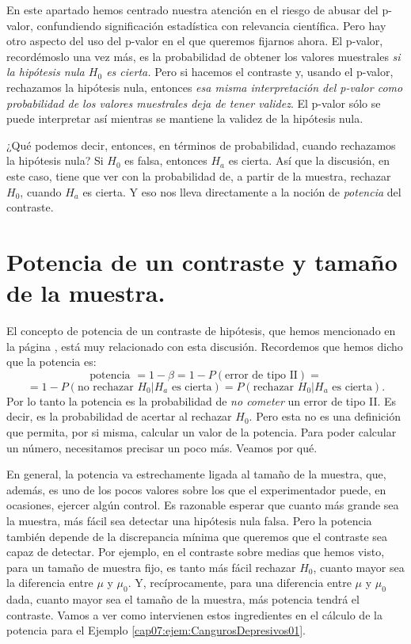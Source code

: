 En este apartado hemos centrado nuestra atención en el riesgo de abusar del p-valor, confundiendo significación estadística con relevancia científica. Pero hay otro aspecto del uso del p-valor en el que queremos fijarnos ahora. El p-valor, recordémoslo una vez más, es la probabilidad de obtener los valores muestrales {\em si la hipótesis nula $H_0$ es cierta.} Pero si hacemos el contraste y, usando el p-valor, rechazamos la hipótesis nula, entonces {\em esa misma interpretación del p-valor como probabilidad de los valores muestrales deja de tener validez}. El p-valor sólo se puede interpretar así mientras se mantiene la validez de la hipótesis nula.

¿Qué podemos decir, entonces, en términos de probabilidad, cuando rechazamos la hipótesis nula? Si $H_0$ es falsa, entonces $H_a$ es cierta. Así que la discusión, en este caso, tiene que ver con la probabilidad de, a partir de la muestra, rechazar $H_0$, cuando $H_a$ es cierta. Y eso nos lleva directamente a la noción de {\em potencia} del contraste.


\section{Potencia de un contraste y tamaño de la muestra.}
\label{cap07:sec:PotenciaContraste}


El concepto de {\sf potencia} de un contraste de hipótesis, que hemos mencionado en la página \pageref{cap07:ecu:BetaErrorTipoII}, está muy relacionado con esta discusión. Recordemos que hemos dicho que la potencia es:
\[\mbox{potencia } =  1-\beta=1-P(\mbox{error de tipo II})=\]
\[=1-P(\mbox{no rechazar }H_0 | H_a\mbox{ es cierta})=P(\mbox{rechazar }H_0 | H_a\mbox{ es cierta}).\]
Por lo tanto la potencia es la probabilidad de {\em no cometer} un error de tipo II. Es decir, es la probabilidad de acertar al rechazar $H_0$. Pero esta no es una definición que permita, por si misma, calcular un valor de la potencia. Para poder calcular un número, necesitamos precisar un poco más. Veamos por qué.

En general, la potencia va estrechamente ligada al tamaño de la muestra, que, además, es uno de los pocos valores sobre los que el experimentador puede, en ocasiones, ejercer algún control. Es razonable esperar que cuanto más grande sea la muestra, más fácil sea detectar una hipótesis nula falsa. Pero la potencia también depende de la discrepancia mínima que queremos que el contraste sea capaz de detectar. Por ejemplo, en el contraste sobre medias que hemos visto, para un tamaño de muestra fijo, es tanto más fácil rechazar $H_0$, cuanto mayor sea la diferencia entre $\mu$ y $\mu_0$. Y, recíprocamente, para una diferencia entre $\mu$ y $\mu_0$ dada, cuanto mayor sea el tamaño de la muestra, más potencia tendrá el contraste. Vamos a ver como intervienen estos ingredientes en el cálculo de la potencia para el Ejemplo \ref{cap07:ejem:CangurosDepresivos01}.

